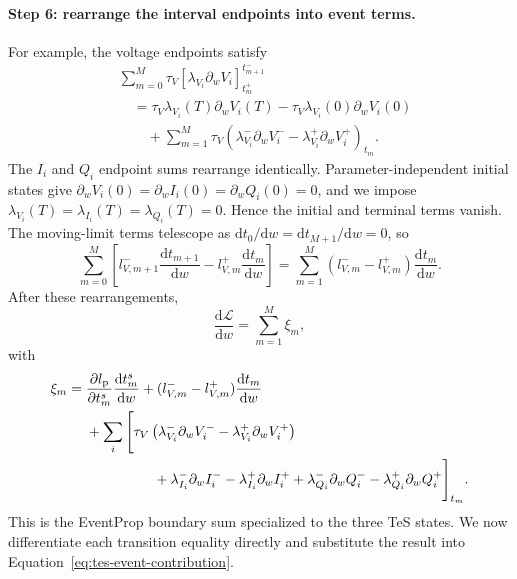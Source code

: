 \paragraph{Step 6: rearrange the interval endpoints into event terms.}
For example, the voltage endpoints satisfy
\begin{align}
    &\sum_{m=0}^{M}
      \tau_V\left[
        \lambda_{V_i}\partial_wV_i
      \right]_{t_m^+}^{t_{m+1}^-}
      \nonumber\\
    &\quad=
      \tau_V\lambda_{V_i}(T)\partial_wV_i(T)
      -\tau_V\lambda_{V_i}(0)\partial_wV_i(0)
      \nonumber\\
    &\qquad+
      \sum_{m=1}^{M}\tau_V\left(
        \lambda_{V_i}^-\partial_wV_i^-
        -\lambda_{V_i}^+\partial_wV_i^+
      \right)_{t_m}.
    \label{eq:tes-telescope-v}
\end{align}
The $I_i$ and $Q_i$ endpoint sums rearrange identically.
Parameter-independent initial states give
$\partial_wV_i(0)=\partial_wI_i(0)=\partial_wQ_i(0)=0$, and we impose
$\lambda_{V_i}(T)=\lambda_{I_i}(T)=\lambda_{Q_i}(T)=0$. Hence the initial
and terminal terms vanish. The moving-limit terms telescope as
\(
\mathrm dt_0/\mathrm dw
=\mathrm dt_{M+1}/\mathrm dw=0
\), so
\begin{equation}
    \sum_{m=0}^{M}\left[
       l_{V,m+1}^-\frac{\mathrm dt_{m+1}}{\mathrm dw}
       -l_{V,m}^+\frac{\mathrm dt_m}{\mathrm dw}
    \right]
    =
    \sum_{m=1}^{M}
      (l_{V,m}^- -l_{V,m}^+)
      \frac{\mathrm dt_m}{\mathrm dw}.
    \label{eq:tes-telescope-loss}
\end{equation}
After these rearrangements,
\begin{equation}
    \frac{\mathrm d\mathcal L}{\mathrm dw}
      =\sum_{m=1}^{M}\xi_m,
    \label{eq:tes-gradient-event-sum}
\end{equation}
with
\begin{align}
    \xi_m={}&
      \frac{\partial l_{\mathrm p}}{\partial t^s_{m}}
      \frac{\mathrm dt^s_{m}}{\mathrm dw}
      +(l_{V,m}^- -l_{V,m}^+)\frac{\mathrm dt_m}{\mathrm dw}
      \nonumber\\
    &+\sum_i\Bigg[
      \tau_V\left(
        \lambda_{V_i}^-\partial_wV_i^-
        -\lambda_{V_i}^+\partial_wV_i^+
      \right)
      \nonumber\\
    &\hspace{17mm}
      +\lambda_{I_i}^-\partial_wI_i^-
       -\lambda_{I_i}^+\partial_wI_i^+
      +\lambda_{Q_i}^-\partial_wQ_i^-
       -\lambda_{Q_i}^+\partial_wQ_i^+
      \Bigg]_{t_m}.
    \label{eq:tes-event-contribution}
\end{align}
This is the EventProp boundary sum specialized to the three TeS states.
We now differentiate each transition equality directly and substitute the
result into Equation~\eqref{eq:tes-event-contribution}.

